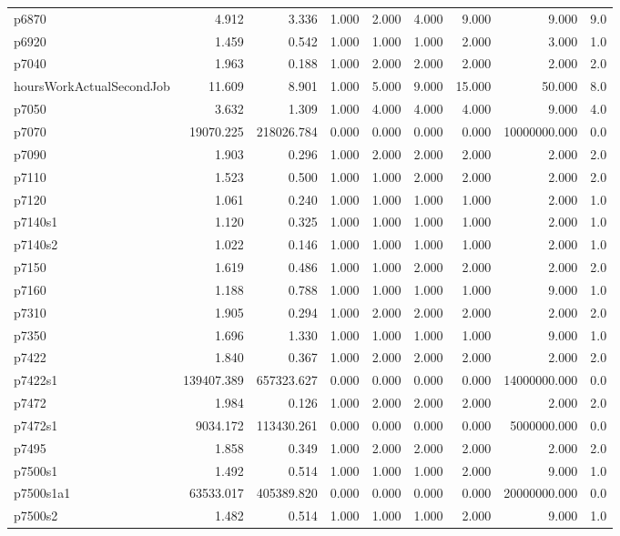 \begin{longtable}{lrrrrrrrl}
p6870 & 4.912 & 3.336 & 1.000 & 2.000 & 4.000 & 9.000 & 9.000 & 9.0 \\
p6920 & 1.459 & 0.542 & 1.000 & 1.000 & 1.000 & 2.000 & 3.000 & 1.0 \\
p7040 & 1.963 & 0.188 & 1.000 & 2.000 & 2.000 & 2.000 & 2.000 & 2.0 \\
hoursWorkActualSecondJob & 11.609 & 8.901 & 1.000 & 5.000 & 9.000 & 15.000 & 50.000 & 8.0 \\
p7050 & 3.632 & 1.309 & 1.000 & 4.000 & 4.000 & 4.000 & 9.000 & 4.0 \\
p7070 & 19070.225 & 218026.784 & 0.000 & 0.000 & 0.000 & 0.000 & 10000000.000 & 0.0 \\
p7090 & 1.903 & 0.296 & 1.000 & 2.000 & 2.000 & 2.000 & 2.000 & 2.0 \\
p7110 & 1.523 & 0.500 & 1.000 & 1.000 & 2.000 & 2.000 & 2.000 & 2.0 \\
p7120 & 1.061 & 0.240 & 1.000 & 1.000 & 1.000 & 1.000 & 2.000 & 1.0 \\
p7140s1 & 1.120 & 0.325 & 1.000 & 1.000 & 1.000 & 1.000 & 2.000 & 1.0 \\
p7140s2 & 1.022 & 0.146 & 1.000 & 1.000 & 1.000 & 1.000 & 2.000 & 1.0 \\
p7150 & 1.619 & 0.486 & 1.000 & 1.000 & 2.000 & 2.000 & 2.000 & 2.0 \\
p7160 & 1.188 & 0.788 & 1.000 & 1.000 & 1.000 & 1.000 & 9.000 & 1.0 \\
p7310 & 1.905 & 0.294 & 1.000 & 2.000 & 2.000 & 2.000 & 2.000 & 2.0 \\
p7350 & 1.696 & 1.330 & 1.000 & 1.000 & 1.000 & 1.000 & 9.000 & 1.0 \\
p7422 & 1.840 & 0.367 & 1.000 & 2.000 & 2.000 & 2.000 & 2.000 & 2.0 \\
p7422s1 & 139407.389 & 657323.627 & 0.000 & 0.000 & 0.000 & 0.000 & 14000000.000 & 0.0 \\
p7472 & 1.984 & 0.126 & 1.000 & 2.000 & 2.000 & 2.000 & 2.000 & 2.0 \\
p7472s1 & 9034.172 & 113430.261 & 0.000 & 0.000 & 0.000 & 0.000 & 5000000.000 & 0.0 \\
p7495 & 1.858 & 0.349 & 1.000 & 2.000 & 2.000 & 2.000 & 2.000 & 2.0 \\
p7500s1 & 1.492 & 0.514 & 1.000 & 1.000 & 1.000 & 2.000 & 9.000 & 1.0 \\
p7500s1a1 & 63533.017 & 405389.820 & 0.000 & 0.000 & 0.000 & 0.000 & 20000000.000 & 0.0 \\
p7500s2 & 1.482 & 0.514 & 1.000 & 1.000 & 1.000 & 2.000 & 9.000 & 1.0 \\

\end{longtable}
